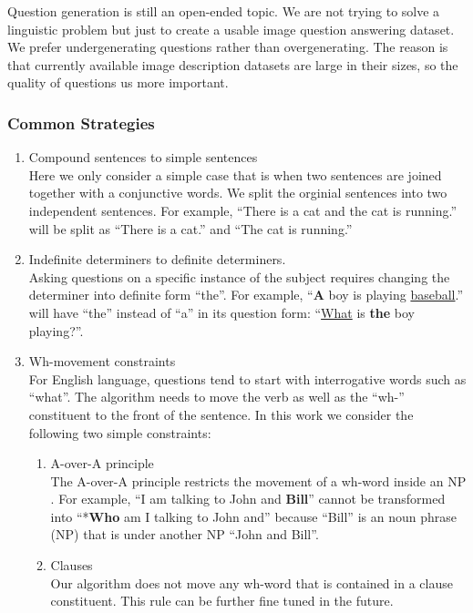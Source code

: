 \documentclass{article}
\renewcommand{\#}[1]{\textbf{#1}}
\begin{document}
Question generation is still an open-ended topic. We are not trying to solve a linguistic problem but just to create a usable image question answering dataset. We prefer undergenerating questions rather than overgenerating. The reason is that currently available image description datasets are large in their sizes, so the quality of questions us more important.

\subsubsection{Common Strategies}
\begin{enumerate}
\item Compound sentences to simple sentences \\
Here we only consider a simple case that is when two sentences are joined together with a conjunctive words. We split the orginial sentences into two independent sentences. For example, ``There is a cat and the cat is running.'' will be split as ``There is a cat.'' and ``The cat is running.''

\item Indefinite determiners to definite determiners.\\
Asking questions on a specific instance of the subject requires changing the determiner into definite form ``the''. For example, ``\textbf{A} boy is playing \underline{baseball}.'' will have ``the'' instead of ``a'' in its question form: ``\underline{What} is \textbf{the} boy playing?''.

\item Wh-movement constraints \\
For English language, questions tend to start with interrogative words such as ``what''. The algorithm needs to move the verb as well as the ``wh-'' constituent to the front of the sentence. In this work we consider the following two simple constraints:
\begin{enumerate}
\item A-over-A principle\\
The A-over-A principle restricts the movement of a wh-word inside an NP \cite{chomsky73}. For example, ``I am talking to John and \textbf{Bill}'' cannot be transformed into ``*\textbf{Who} am I talking to John and'' because ``Bill'' is an noun phrase (NP) that is under another NP ``John and Bill''.
\item Clauses\\
Our algorithm does not move any wh-word that is contained in a clause constituent. This rule can be further fine tuned in the future.
\end{enumerate}
\end{enumerate}
\end{document}

